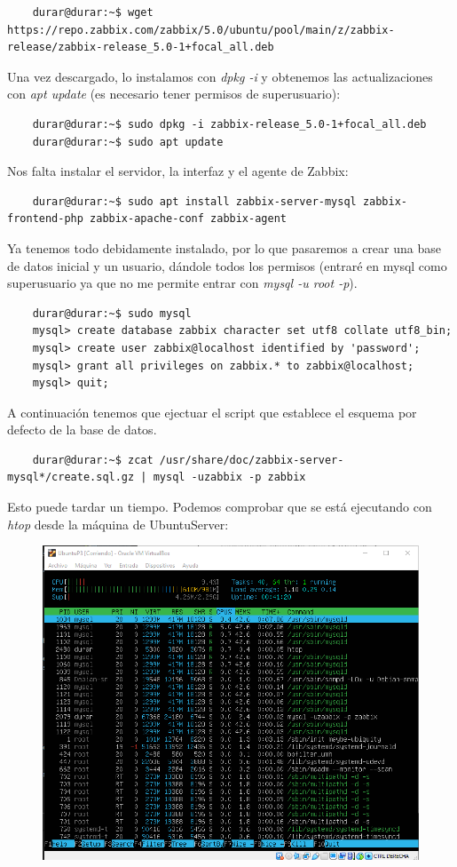 \documentclass[a4paper]{article}
\begin{document}
\begin{lstlisting}
    durar@durar:~$ wget https://repo.zabbix.com/zabbix/5.0/ubuntu/pool/main/z/zabbix-release/zabbix-release_5.0-1+focal_all.deb
\end{lstlisting}
Una vez descargado, lo instalamos con \textsl{dpkg -i} y obtenemos las actualizaciones
con \textsl{apt update} (es necesario tener permisos de superusuario):
\begin{lstlisting}
    durar@durar:~$ sudo dpkg -i zabbix-release_5.0-1+focal_all.deb
    durar@durar:~$ sudo apt update
\end{lstlisting}
Nos falta instalar el servidor, la interfaz y el agente de Zabbix:
\begin{lstlisting}
    durar@durar:~$ sudo apt install zabbix-server-mysql zabbix-frontend-php zabbix-apache-conf zabbix-agent
\end{lstlisting}
Ya tenemos todo debidamente instalado, por lo que pasaremos a crear una base de 
datos inicial y un usuario, dándole todos los permisos (entraré en mysql como superusuario ya que no 
me permite entrar con \textsl{mysql -u root -p}).
\begin{lstlisting}
    durar@durar:~$ sudo mysql 
    mysql> create database zabbix character set utf8 collate utf8_bin;
    mysql> create user zabbix@localhost identified by 'password';
    mysql> grant all privileges on zabbix.* to zabbix@localhost;
    mysql> quit;
\end{lstlisting}
A continuación tenemos que ejectuar el script que establece el esquema por defecto de 
la base de datos.
\begin{lstlisting}
    durar@durar:~$ zcat /usr/share/doc/zabbix-server-mysql*/create.sql.gz | mysql -uzabbix -p zabbix
\end{lstlisting}
Esto puede tardar un tiempo. Podemos comprobar que se está ejecutando con \textsl{htop}
desde la máquina de UbuntuServer:
\begin{figure}
    \centering
    \includegraphics[width=1.0\textwidth]{htop de mysql.png}
\end{figure}
\end{document}
